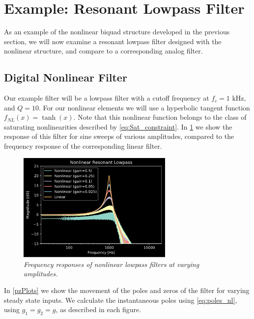 \documentclass[twoside,a4paper]{article}
\begin{document}
\section{Example: Resonant Lowpass Filter}

As an example of the nonlinear biquad structure developed in the
previous section, we will now examine a resonant lowpass filter
designed with the nonlinear structure, and compare to a corresponding
analog filter.

\subsection{Digital Nonlinear Filter}

Our example filter will be a lowpass filter with a cutoff frequency at
$f_c = 1\text{ kHz}$, and $Q = 10$. For our nonlinear elements we will
use a hyperbolic tangent function $f_{NL}(x) = \tanh (x)$. Note that
this nonlinear function belongs to the class of saturating nonlinearities
described by \cref{eq:Sat_constraint}.
\newline\newline
In \cref{NL-LPF-freq} we show the response of this filter for sine sweeps of
various amplitudes, compared to the frequency response of the corresponding
linear filter.
%
\begin{figure}[ht]
    \center
    \includegraphics[width=3in]{../Pics/NL-LPF.png}
    \caption{\label{NL-LPF-freq}{\it Frequency responses of nonlinear lowpass
                                    filters at varying amplitudes.}}
\end{figure}
%
In \cref{pzPlots} we show the movement of the poles and zeros of
the filter for varying steady state inputs. We calculate the instantaneous
poles using \cref{eq:poles_nl}, using $g_1 = g_2 = g$, as described in
each figure.
\end{document}
